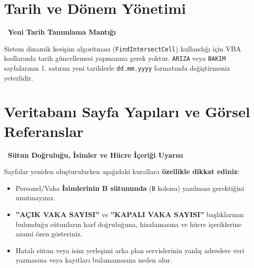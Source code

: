 \section{Tarih ve Dönem Yönetimi}

\begin{infobox}
\textbf{\faCalendar*\ Yeni Tarih Tanımlama Mantığı}

\vspace{0.2cm}
Sistem dinamik kesişim algoritması (\texttt{FindIntersectCell}) kullandığı için VBA kodlarında tarih güncellemesi yapmanıza gerek yoktur. \texttt{ARIZA} veya \texttt{BAKIM} sayfalarının 1. satırını yeni tarihlerle \texttt{dd.mm.yyyy} formatında değiştirmeniz yeterlidir.
\end{infobox}


\newpage
\section{Veritabanı Sayfa Yapıları ve Görsel Referanslar}

\begin{warningbox}
\textbf{\faExclamationCircle\ Sütun Doğruluğu, İsimler ve Hücre İçeriği Uyarısı}

\vspace{0.2cm}
Sayfalar yeniden oluşturulurken aşağıdaki kurallara \textbf{özellikle dikkat ediniz}:
\begin{itemize}\setlength{\itemsep}{1pt}
    \item Personel/Vaka \textbf{İsimlerinin B sütununda} (\texttt{B} kolonu) yazılması gerektiğini unutmayınız.
    \item \textbf{''AÇIK VAKA SAYISI''} ve \textbf{''KAPALI VAKA SAYISI''} başlıklarının bulunduğu sütunların harf doğruluğuna, hizalamasına ve hücre içeriklerine azami özen gösteriniz.
    \item Hatalı sütun veya isim yerleşimi arka plan servislerinin yanlış adreslere veri yazmasına veya kayıtları bulamamasına neden olur.
\end{itemize}
\end{warningbox}

\vspace{0.2cm}

